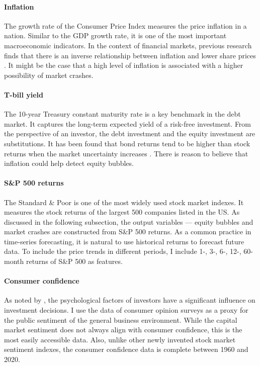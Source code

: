 \documentclass[12pt, man, a4paper, floatsintext]{apa7}
\begin{document}
\paragraph{Inflation} The growth rate of the Consumer Price Index measures the price inflation in a nation. Similar to the GDP growth rate, it is one of the most important macroeconomic indicators. In the context of financial markets, previous research finds that there is an inverse relationship between inflation and lower share prices \parencite{inflation}. It might be the case that a high level of inflation is associated with a higher possibility of market crashes.

\paragraph{T-bill yield} The 10-year Treasury constant maturity rate is a key benchmark in the debt market. It captures the long-term expected yield of a risk-free investment. From the perspective of an investor, the debt investment and the equity investment are substitutions. It has been found that bond returns tend to be higher than stock returns when the market uncertainty increases \parencite{bond}. There is reason to believe that inflation could help detect equity bubbles. 

\paragraph{S\&P 500 returns} The Standard \& Poor is one of the most widely used stock market indexes. It measures the stock returns of the largest 500 companies listed in the US. As discussed in the following subsection, the output variables — equity bubbles and market crashes are constructed from S\&P 500 returns. As a common practice in time-series forecasting, it is natural to use historical returns to forecast future data. To include the price trends in different periods, I include 1-, 3-, 6-, 12-, 60-month returns of S\&P 500 as features.

\paragraph{Consumer confidence} As noted by \textcite{psychology}, the psychological factors of investors have a significant influence on investment decisions. I use the data of consumer opinion surveys as a proxy for the public sentiment of the general business environment. While the capital market sentiment does not always align with consumer confidence, this is the most easily accessible data. Also, unlike other newly invented stock market sentiment indexes,  the consumer confidence data is complete between 1960 and 2020.
\end{document}
